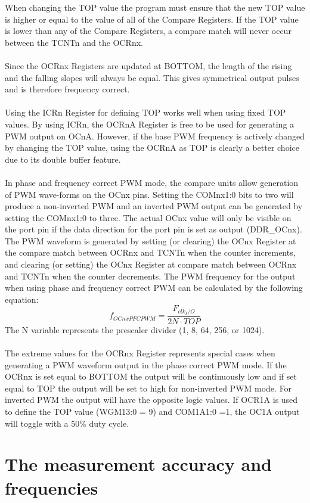 \documentclass[english]{article}
\begin{document}
When changing the TOP value the program must ensure that the new TOP value is higher or equal to the value of all of the Compare Registers. If the TOP value is lower than any of the Compare Registers, a compare match will never occur between the TCNTn and the OCRnx.\\\\
Since the OCRnx Registers are updated at BOTTOM, the length of the rising and the falling slopes will always be equal. This gives symmetrical output pulses and is therefore
frequency correct.\\\\
Using the ICRn Register for defining TOP works well when using fixed TOP values. By using ICRn, the OCRnA Register is free to be used for generating a PWM output on OCnA. However, if the base PWM frequency is actively changed by changing the TOP value, using the OCRnA as TOP is clearly a better choice due to its double buffer feature.\\\\
In phase and frequency correct PWM mode, the compare units allow generation of PWM wave-forms on the OCnx pins. Setting the COMnx1:0 bits to two will produce a non-inverted PWM and an inverted PWM output can be generated by setting the COMnx1:0 to three. The actual OCnx value will only be visible
on the port pin if the data direction for the port pin is set as output (DDR\_OCnx). The PWM waveform is generated by setting (or clearing) the OCnx Register at the compare match between OCRnx and TCNTn when the counter increments, and clearing (or setting) the OCnx Register at compare match between OCRnx and TCNTn when the counter decrements. The PWM frequency for the output when using phase and frequency correct PWM can be calculated by the following equation:
$$
f_{OCnxPFCPWM}=\frac{F_{clk_I/O}}{2N \cdot TOP}
$$
The N variable represents the prescaler divider (1, 8, 64, 256, or 1024).\\\\
The extreme values for the OCRnx Register represents special cases when generating a PWM waveform output in the phase correct PWM mode. If the OCRnx is set equal to BOTTOM the output will be continuously low and if set equal to TOP the output will be set to high for non-inverted PWM mode. For inverted PWM the output will have the opposite logic values. If OCR1A is used to define the TOP value (WGM13:0 = 9) and COM1A1:0 =1, the OC1A output will toggle with a 50\% duty cycle.
\section{The measurement accuracy and frequencies}
\end{document}
